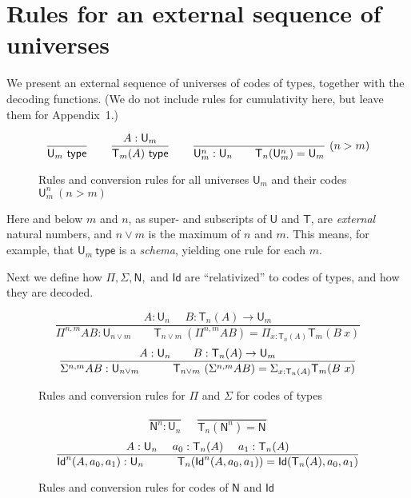 \documentclass[11pt,a4paper]{article}
\theoremstyle{definition}
\newcommand{\Id}{\mathsf{Id}}
\newcommand{\NN}{\mathsf{N}}
\newcommand{\UU}{\mathsf{U}}
\newcommand{\type}{\mathsf{type}}
\newcommand{\mypi}[3]{\Pi_{#1:#2}#3}
\newcommand{\mysig}[3]{\Sigma_{#1:#2}#3}
\newcommand{\sapp}[2]{{#1(#2)}} %
\newcommand{\Idapp}[3]{\sapp{\Id}{#1,#2,#3}}
\newcommand{\Idnapp}[4]{\sapp{\Id^#4}{#1,#2,#3}}
\newcommand{\T}{\mathsf{T}}
\begin{document}
\section{Rules for an external sequence of universes}\label{sec:external}


We present an external sequence of universes of codes of types, together
with the decoding functions. (We do not include rules for cumulativity here, but leave them for Appendix~1.)

\begin{figure}[H]
  \caption{Rules and conversion rules for all universes $\UU_m$ and their codes $\UU^{n}_{m}~(n>m)$}\label{fig:typeU}
$$
\frac{}{\UU_m~\type}~~~~~~
\frac{A:\UU_{m}}{\T_{m}(A)~\type}~~~~~~
\frac{}{\UU^{n}_{m}:\UU_{n}~~~~~~\T_{n}({\UU^{n}_{m}}) = \UU_{m}}{~(n>m)}
\belowdisplayshortskip 0pt
$$
\end{figure}

Here and below $m$ and $n$, as super- and subscripts of $\UU$ and $\T$,
are \emph{external} natural numbers, and $n \vee m$ is the
maximum of $n$ and $m$. This means, for example, that $\UU_m~\type$ is
a \emph{schema}, yielding one rule for each $m$.

Next we define how $\Pi, \Sigma, \NN,$ and $\Id$ are ``relativized'' to
codes of types, and how they are decoded.

\begin{figure}[H]
  \caption{Rules and conversion rules for $\Pi$ and $\Sigma$ for codes of types}\label{fig:PiSigU}
$$
\frac{A:\UU_{n}~~~~~~B:\T_{n}(A)\rightarrow \UU_{m}}
     {\Pi^{n,m} A B:\UU_{n\vee m}~~~~~~~~~
      \T_{n\vee m}~(\Pi^{n,m} A B) = \mypi{x}{\T_{n}(A)}{ \T_{m}(B~x)}}
$$
$$
\frac{A:\UU_{n}~~~~~~B:\T_{n}(A)\rightarrow \UU_{m}}
     {\Sigma^{n,m} A B:\UU_{n\vee m}~~~~~~~~~
     \T_{n\vee m}~(\Sigma^{n,m} A B) = \mysig {x}{\T_{n}(A)}{ \T_{m}(B~x)}}
\belowdisplayshortskip -1pt
$$
\end{figure}

\begin{figure}[H]
\caption{Rules and conversion rules for codes of $\NN$ and $\Id$}\label{fig:NIdU}
$$
\frac{}{\NN^{n}:\UU_{n}}~~~~~~\frac{}{\T_{n}(\NN^{n}) = \NN}
$$
$$
\frac{A:\UU_n~~~~a_0:\T_n(A)~~~~a_1:\T_n(A)}
{\Idnapp{A}{a_0}{a_1}{n}:\UU_n ~~~~~~~~~ \T_n(\Idnapp{A}{a_0}{a_1}{n}) = \Idapp{{\T_n(A)}}{a_0}{a_1} }
\belowdisplayshortskip 1pt
$$
\end{figure}
\end{document}
